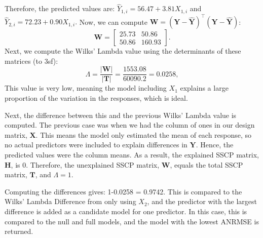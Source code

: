\documentclass[11pt]{report} %
\begin{document}
Therefore, the predicted values are: $
\hat{Y}_{1,i} = 56.47 + 3.81 X_{1,i}$ and $
\hat{Y}_{2,i} = 72.23 + 0.90 X_{1,i}.
$ Now, we can compute \(\mathbf{W}=({\mathbf{Y}} - \hat{\mathbf{Y}})^\top ({\mathbf{Y}} - \hat{\mathbf{Y}})\):
\[
\mathbf{W} =
\begin{bmatrix}
25.73 & 50.86 \\
50.86 & 160.93
\end{bmatrix}.
\]
Next, we compute the Wilks' Lambda value using the determinants of these matrices (to 3sf):
\[
\Lambda = \frac{|\mathbf{W}|}{|\mathbf{T}|}= \frac{1553.08}{60090.2} = 0.0258,
\]
This value is very low, meaning the model including $X_1$ explains a large proportion of the variation in the responses, which is ideal.

Next, the difference between this and the previous Wilks' Lambda value is computed. The previous case was when we had the column of ones in our design matrix, $\mathbf{X}$. This means the model only estimated the mean of each response, so no actual predictors were included to explain differences in $\mathbf{Y}$. Hence, the predicted values were the column means. As a result, the explained SSCP matrix, $\mathbf{H}$, is 0. Therefore, the unexplained SSCP matrix, $\mathbf{W}$, equals the total SSCP matrix, $\mathbf{T}$, and $\Lambda = 1$.

Computing the differences gives: 1-0.0258 = 0.9742. This is compared to the Wilks' Lambda Difference from only using $X_2$, and the predictor with the largest difference is added as a candidate model for one predictor. In this case, this is compared to the null and full models, and the model with the lowest ANRMSE is returned. 
\end{document}

